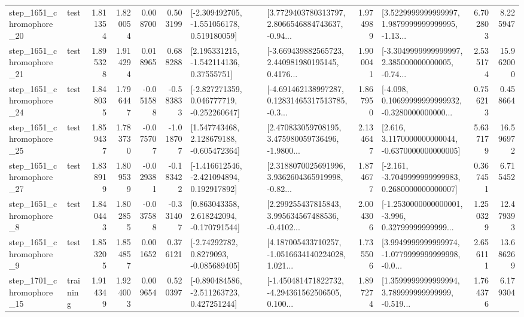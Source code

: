 \begin{tabular}{llrrrrllrlrr}
 step\_1651\_chromophore\_20 &      test &      1.811354 &    1.820054 &      0.008700 &  0.503199 &   [-2.309492705, -1.551056178, 0.519180059] &  [3.7729403780313797, 2.8066546884743637, -0.94... &       1.974989 &  [3.5229999999999997, 1.9879999999999995, -1.13... &            6.702803 &          8.225947 \\
 step\_1651\_chromophore\_21 &      test &      1.895328 &    1.914294 &      0.018965 &  0.688288 &     [2.195331215, -1.542114136, 0.37555751] &  [-3.669439882565723, 2.440981980195145, 0.4176... &       1.900041 &  [-3.3049999999999997, 2.385000000000005, -0.74... &            2.535174 &         15.962000 \\
 step\_1651\_chromophore\_24 &      test &      1.848035 &    1.796447 &     -0.051588 & -0.583833 &   [-2.827271359, 0.046777719, -0.252260647] &  [-4.691462138997287, 0.12831465317513785, -0.3... &       1.867950 &  [-4.098, 0.10699999999999932, -0.3280000000000... &            0.756213 &          0.458664 \\
 step\_1651\_chromophore\_25 &      test &      1.859437 &    1.783730 &     -0.075707 & -1.018707 &    [1.547743468, 2.128679188, -0.605472364] &  [2.470833059708195, 3.475980059736496, -1.9800... &       2.134647 &   [2.616, 3.1170000000000044, -0.6370000000000005] &            5.637179 &         16.596972 \\
 step\_1651\_chromophore\_27 &      test &      1.838919 &    1.809539 &     -0.029381 & -0.183422 &   [-1.416612546, -2.421094894, 0.192917892] &  [2.3188070025691996, 3.9362604365919998, -0.82... &       1.874677 &  [-2.161, -3.7049999999999983, 0.2680000000000007] &            0.367451 &          6.715452 \\
  step\_1651\_chromophore\_8 &      test &      1.840443 &    1.802855 &     -0.037588 & -0.331407 &    [0.863043358, 2.618242094, -0.170791544] &  [2.299255437815843, 3.995634567488536, -0.4102... &       2.004306 &  [-1.2530000000000001, -3.996, 0.32799999999999... &            1.250329 &         12.479393 \\
  step\_1651\_chromophore\_9 &      test &      1.853205 &    1.854857 &      0.001652 &  0.376121 &      [-2.74292782, 0.8279093, -0.085689405] &  [4.187005433710257, -1.0516634140224028, 1.021... &       1.735506 &  [3.9949999999999974, -1.0779999999999998, -0.0... &            2.656111 &         13.686269 \\
 step\_1701\_chromophore\_15 &  training &      1.914349 &    1.924003 &      0.009654 &  0.520397 &   [-0.890484586, -2.511263723, 0.427251244] &  [-1.450481471822732, -4.294361562506505, 0.100... &       1.897274 &  [1.3599999999999994, 3.789999999999999, -0.519... &            1.764376 &          6.179304 \\

\end{tabular}
